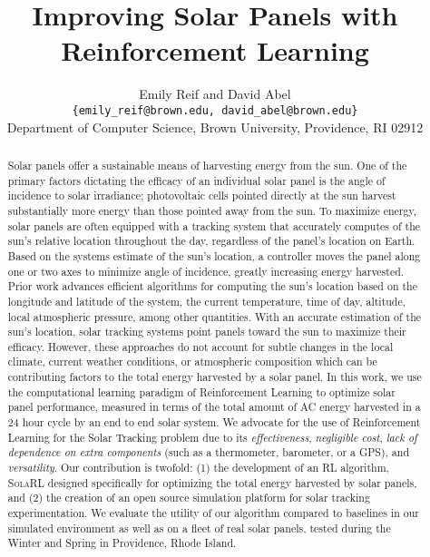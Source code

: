 \documentclass[11pt]{article}
\title{Improving Solar Panels with Reinforcement Learning}
\author{Emily Reif  and David Abel \\ \texttt{\{emily\_reif@brown.edu, david\_abel@brown.edu\}} \\ Department of Computer Science, Brown University, Providence, RI 02912 }
\date{}
\begin{document}
\maketitle

\begin{abstract}
Solar panels offer a sustainable means of harvesting energy from the sun. One of the primary factors dictating the efficacy of an individual solar panel is the angle of incidence to solar irradiance; photovoltaic cells pointed directly at the sun harvest substantially more energy than those pointed away from the sun. To maximize energy, solar panels are often equipped with a tracking system that accurately computes of the sun's relative location throughout the day, regardless of the panel's location on Earth. Based on the systems estimate of the sun's location, a controller moves the panel along one or two axes to minimize angle of incidence, greatly increasing energy harvested. Prior work advances efficient algorithms for computing the sun's location based on the longitude and latitude of the system, the current temperature, time of day, altitude, local atmospheric pressure, among other quantities. With an accurate estimation of the sun's location, solar tracking systems point panels toward the sun to maximize their efficacy. However, these approaches do not account for subtle changes in the local climate, current weather conditions, or atmospheric composition which can be contributing factors to the total energy harvested by a solar panel. In this work, we use the computational learning paradigm of Reinforcement Learning to optimize solar panel performance, measured in terms of the total amount of AC energy harvested in a 24 hour cycle by an end to end solar system. We advocate for the use of Reinforcement Learning for the Solar Tracking problem due to its {\it effectiveness}, {\it negligible cost}, {\it lack of dependence on extra components} (such as a thermometer, barometer, or a GPS), and {\it versatility}. Our contribution is twofold: (1) the development of an RL algorithm, \textsc{SolaRL} designed specifically for optimizing the total energy harvested by solar panels, and (2) the creation of an open source simulation platform for solar tracking experimentation. We evaluate the utility of our algorithm compared to baselines in our simulated environment as well as on a fleet of real solar panels, tested during the Winter and Spring in Providence, Rhode Island.
\end{abstract}
\end{document}
